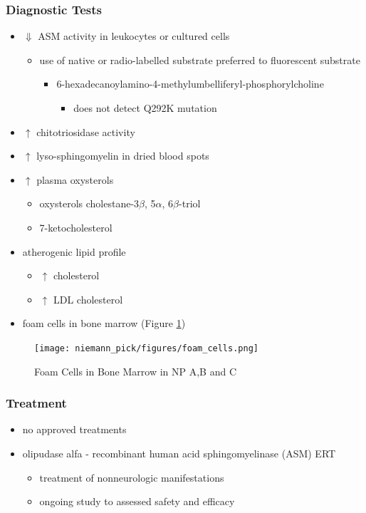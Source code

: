 \documentclass[12pt]{scrartcl}
\begin{document}
\subsubsection{Diagnostic Tests}
\label{sec:orgf8eecb2}
\begin{itemize}
\item \(\Downarrow\) ASM activity in leukocytes or cultured cells
\begin{itemize}
\item use of native or radio-labelled substrate preferred to fluorescent substrate
\begin{itemize}
\item 6-hexadecanoylamino-4-methylumbelliferyl-phosphorylcholine
\begin{itemize}
\item does not detect Q292K mutation
\end{itemize}
\end{itemize}
\end{itemize}
\item \(\uparrow\) chitotriosidase activity
\item \(\uparrow\) lyso-sphingomyelin in dried blood spots
\item \(\uparrow\) plasma oxysterols
\begin{itemize}
\item oxysterols cholestane-3\(\beta\), 5\(\alpha\), 6\(\beta\)-triol
\item 7-ketocholesterol
\end{itemize}
\item atherogenic lipid profile 
\begin{itemize}
\item \(\uparrow\) cholesterol
\item \(\uparrow\) LDL cholesterol
\end{itemize}
\item foam cells in bone marrow (Figure \ref{fig:orgbca9e74})
\end{itemize}

\begin{figure}[htbp]
\centering
\texttt{[image: niemann\_pick/figures/foam\_cells.png]}
\caption{\label{fig:orgbca9e74}Foam Cells in Bone Marrow in NP A,B and C}
\end{figure}

\subsubsection{Treatment}
\label{sec:org1327741}
\begin{itemize}
\item no approved treatments
\item olipudase alfa - recombinant human acid sphingomyelinase (ASM) ERT
\begin{itemize}
\item treatment of nonneurologic manifestations
\item ongoing study to assessed safety and efficacy
\end{itemize}
\end{itemize}
\end{document}
